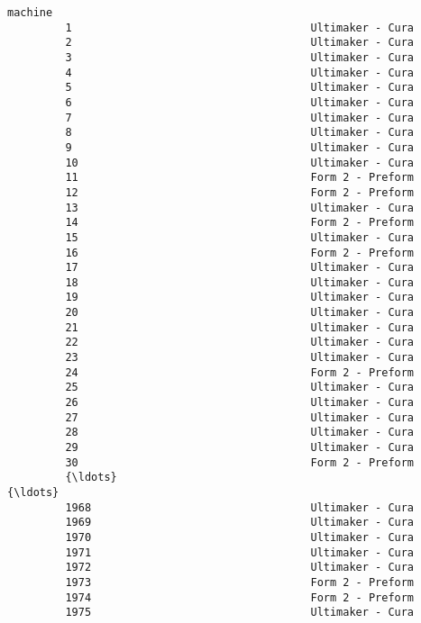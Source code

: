 \documentclass[11pt]{article}
\begin{document}
\begin{Verbatim}[commandchars=\\\{\}]
                                                        machine  
         1                                     Ultimaker - Cura  
         2                                     Ultimaker - Cura  
         3                                     Ultimaker - Cura  
         4                                     Ultimaker - Cura  
         5                                     Ultimaker - Cura  
         6                                     Ultimaker - Cura  
         7                                     Ultimaker - Cura  
         8                                     Ultimaker - Cura  
         9                                     Ultimaker - Cura  
         10                                    Ultimaker - Cura  
         11                                    Form 2 - Preform  
         12                                    Form 2 - Preform  
         13                                    Ultimaker - Cura  
         14                                    Form 2 - Preform  
         15                                    Ultimaker - Cura  
         16                                    Form 2 - Preform  
         17                                    Ultimaker - Cura  
         18                                    Ultimaker - Cura  
         19                                    Ultimaker - Cura  
         20                                    Ultimaker - Cura  
         21                                    Ultimaker - Cura  
         22                                    Ultimaker - Cura  
         23                                    Ultimaker - Cura  
         24                                    Form 2 - Preform  
         25                                    Ultimaker - Cura  
         26                                    Ultimaker - Cura  
         27                                    Ultimaker - Cura  
         28                                    Ultimaker - Cura  
         29                                    Ultimaker - Cura  
         30                                    Form 2 - Preform  
         {\ldots}                                                {\ldots}  
         1968                                  Ultimaker - Cura  
         1969                                  Ultimaker - Cura  
         1970                                  Ultimaker - Cura  
         1971                                  Ultimaker - Cura  
         1972                                  Ultimaker - Cura  
         1973                                  Form 2 - Preform  
         1974                                  Form 2 - Preform  
         1975                                  Ultimaker - Cura  

\end{Verbatim}
\end{document}

